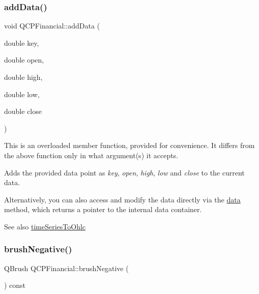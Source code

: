 \subsubsection{\texorpdfstring{add\+Data()}{addData()}\hspace{0.1cm}{\footnotesize\ttfamily [2/2]}}
{\footnotesize\ttfamily void Q\+C\+P\+Financial\+::add\+Data (\begin{DoxyParamCaption}\item[{double}]{key,  }\item[{double}]{open,  }\item[{double}]{high,  }\item[{double}]{low,  }\item[{double}]{close }\end{DoxyParamCaption})}

This is an overloaded member function, provided for convenience. It differs from the above function only in what argument(s) it accepts.

Adds the provided data point as {\itshape key}, {\itshape open}, {\itshape high}, {\itshape low} and {\itshape close} to the current data.

Alternatively, you can also access and modify the data directly via the \hyperlink{class_q_c_p_financial_aec3f666271cf48bd7b87d84fe3f8c074}{data} method, which returns a pointer to the internal data container.

\begin{DoxySeeAlso}{See also}
\hyperlink{class_q_c_p_financial_a9a058c035040d3939b8884f4aaccb1a7}{time\+Series\+To\+Ohlc} 
\end{DoxySeeAlso}
\mbox{\label{class_q_c_p_financial_ad4fdc5bc21f5eb17070e043bd4a35f53}} 
\subsubsection{\texorpdfstring{brush\+Negative()}{brushNegative()}}
{\footnotesize\ttfamily Q\+Brush Q\+C\+P\+Financial\+::brush\+Negative (\begin{DoxyParamCaption}{ }\end{DoxyParamCaption}) const\hspace{0.3cm}{\ttfamily [inline]}}

\mbox{\label{class_q_c_p_financial_ae922e75f3d5b8854369ac0bf1ebfb053}} 
